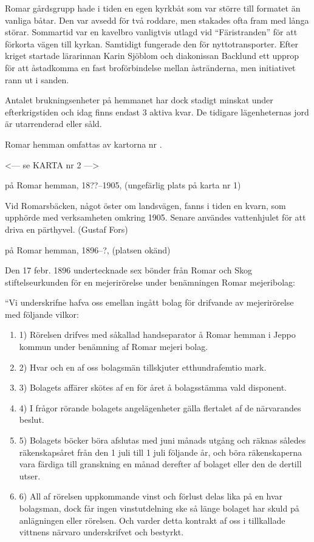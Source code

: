 
Romar gårdsgrupp hade i tiden en egen kyrkbåt som var större till formatet än vanliga båtar. Den var avsedd för två roddare, men stakades ofta fram med långa störar. Sommartid var en kavelbro vanligtvis utlagd vid ``Färistranden'' för att förkorta vägen till kyrkan. Samtidigt fungerade den för nyttotransporter. Efter kriget startade lärarinnan Karin Sjöblom och diakonissan Backlund ett upprop för att åstadkomma en fast broförbindelse mellan åstränderna, men initiativet rann ut i sanden.

Antalet brukningsenheter på hemmanet har dock stadigt minskat under efterkrigstiden och idag finns endast 3 aktiva kvar. De tidigare lägenheternas jord är utarrenderad eller såld.



Romar hemman omfattas av kartorna nr .


<--- se KARTA nr 2 --->


%
 på Romar hemman, 18??--1905, (ungefärlig plats på karta nr 1)

Vid Romarsbäcken, något öster om landsvägen, fanns i tiden en kvarn, som upphörde med verksamheten omkring 1905. Senare användes vattenhjulet för att driva en pärthyvel. (Gustaf Fors)


%
 på Romar hemman, 1896--?, (platsen okänd)

Den 17 febr. 1896 undertecknade sex bönder från Romar och Skog stiftelseurkunden för en mejerirörelse under benämningen Romar mejeribolag:

``Vi underskrifne hafva oss emellan ingått bolag för drifvande av mejerirörelse med följande vilkor:
\begin{enumerate}
  \item 1) Rörelsen drifves med såkallad handseparator å Romar hemman i Jeppo kommun under benämning af Romar mejeri bolag.
  \item 2) Hvar och en af oss bolagsmän tillskjuter etthundrafemtio mark.
  \item 3) Bolagets affärer skötes af en för året å bolagsstämma vald disponent.
  \item 4) I frågor rörande bolagets angelägenheter gälla flertalet af de närvarandes beslut.
  \item 5) Bolagets böcker böra afslutas med juni månads utgång och räknas således räkenskapsåret från den 1 juli till 1 juli följande år, och böra räkenskaperna vara färdiga till granskning en månad derefter af bolaget eller den de dertill utser.
  \item 6) All af rörelsen uppkommande vinst och förlust delas lika på en hvar bolagsman, dock får ingen vinstutdelning ske så länge bolaget har skuld på anlägningen eller rörelsen. Och varder detta kontrakt af oss i tillkallade vittnens närvaro underskrifvet och bestyrkt.
\end{enumerate}

